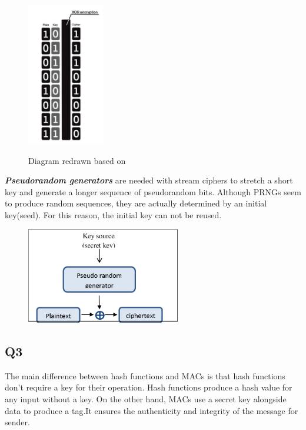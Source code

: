\documentclass{article}
\begin{document}
    \begin{figure}[htbp]
        \centering 
        \caption{Diagram redrawn based on \cite{2-2.Symmetric-Enc-1}}
        \includegraphics[width=0.3\textwidth]{graphs/Stream_cipher.jpg} 
        \label{Stream cipher}
    \end{figure}

	\textbf{\textit{Pseudorandom generators}} are needed with stream ciphers to stretch a short key and generate a longer sequence of pseudorandom bits. Although PRNGs seem to produce random sequences, they are actually determined by an initial key(seed). For this reason, the initial key can not be reused\cite{3-1.Symmetric-Crypto}.

    \begin{figure}[htbp]
        \centering 
        \caption{\cite{phdthesis}}
        \includegraphics[width=0.6\textwidth]{graphs/Stream_cipher_process.png} 
        \label{Stream cipher process}
    \end{figure} 

\subsection{Q3}
	The main difference between hash functions and MACs is that hash functions don't require a key for their operation. Hash functions produce a hash value for any input without a key. On the other hand, MACs use a secret key alongside data to produce a tag.It ensures the authenticity and integrity of the message for sender\cite{3-1.Symmetric-Crypto}.
\end{document}
